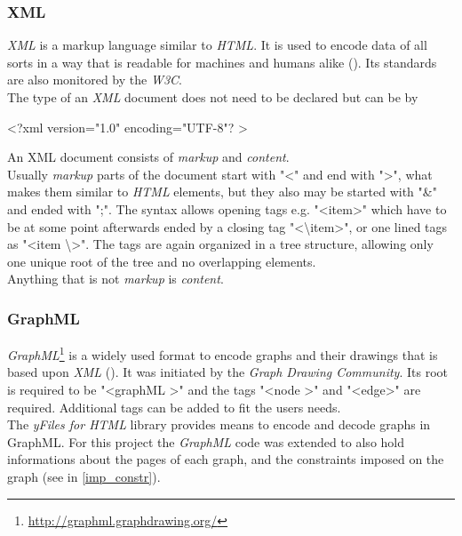 \subsubsection{XML}
\textit{XML}  is a markup language similar to \textit{HTML}. It is used to encode data of all sorts in a way that is readable for machines and humans alike (\cite{wiki-xml}). 
Its standards are also monitored by the \textit{W3C}.\\
The type of an \textit{XML} document does not need to be declared but can be by
\begin{center}
\textless  ?xml version="1.0" encoding="UTF-8"? \textgreater
\end{center}
An XML document consists of \textit{markup} and \textit{content}.\\
Usually \textit{markup} parts of the document start with "\textless " and end with "\textgreater", what makes them similar to \textit{HTML} elements, but they also may be started with "\&" and ended with ";". The syntax allows opening tags e.g. "\textless  item\textgreater" which have to be at some point afterwards ended by a closing tag "\textless  \textbackslash item\textgreater", or one lined tags as "\textless  item \textbackslash \textgreater". The tags are again organized in a tree structure, allowing only one unique root of the tree and no overlapping elements.\\
Anything that is not \textit{markup} is \textit{content}.
\subsubsection{GraphML}
\textit{GraphML}\footnote{\url{http://graphml.graphdrawing.org/}} is a widely used format to encode graphs and their drawings that is based upon \textit{XML} (\cite{wiki-graphml}). It was initiated by the \textit{Graph Drawing Community}. Its root is required to be "\textless  graphML \textgreater" and the tags "\textless  node \textgreater" and "\textless  edge\textgreater" are required. Additional tags can be added to fit the users needs.\\
The \textit{yFiles for HTML} library provides means to encode and decode graphs in GraphML. For this project the \textit{GraphML} code was extended to also hold informations about the pages of each graph, and the constraints imposed on the graph (see in \autoref{imp_constr}).
